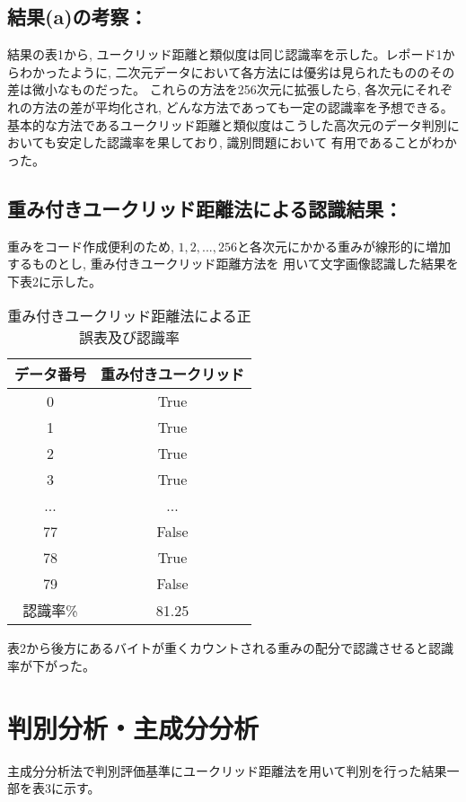\documentclass[twocolumn, 10.5pt]{jsarticle}
\begin{document}
\subsection{結果(a)の考察：}
結果の表1から, ユークリッド距離と類似度は同じ認識率を示した。レポード1からわかったように,
二次元データにおいて各方法には優劣は見られたもののその差は微小なものだった。
これらの方法を256次元に拡張したら, 各次元にそれぞれの方法の差が平均化され, どんな方法であっても一定の認識率を予想できる。
基本的な方法であるユークリッド距離と類似度はこうした高次元のデータ判別においても安定した認識率を果しており, 識別問題において
有用であることがわかった。

\subsection{重み付きユークリッド距離法による認識結果：}
重みをコード作成便利のため, $1, 2, ..., 256$と各次元にかかる重みが線形的に増加するものとし, 重み付きユークリッド距離方法を
用いて文字画像認識した結果を下表2に示した。

\begin{table}[H]
  \caption{重み付きユークリッド距離法による正誤表及び認識率}
  \centering
  \begin{tabular}{|c||c|}\hline
    データ番号 & 重み付きユークリッド \\\hline\hline
    0 & True \\\hline
    1 & True \\\hline
    2 & True \\\hline
    3 & True \\\hline
    ... & ... \\\hline
    77 & False \\\hline
    78 & True \\\hline
    79 & False \\\hline\hline
    認識率\% & 81.25 \\\hline
  \end{tabular}
\end{table}

表2から後方にあるバイトが重くカウントされる重みの配分で認識させると認識率が下がった。


\section{判別分析・主成分分析}
主成分分析法で判別評価基準にユークリッド距離法を用いて判別を行った結果一部を表3に示す。
\end{document}
